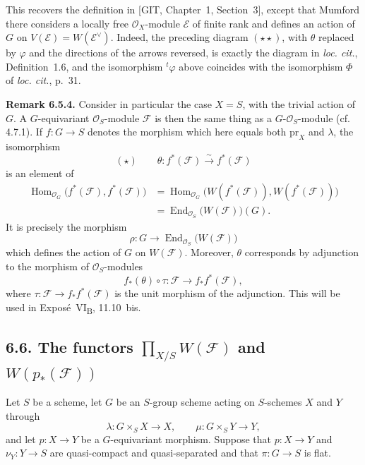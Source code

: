 This recovers the definition in [GIT, Chapter~1, Section~3], except that
Mumford there considers a locally free \(\mathcal O_X\)-module
\(\mathcal E\) of finite rank and defines an action of \(G\) on
\(V(\mathcal E)=W(\mathcal E^\vee)\). Indeed, the preceding diagram
\((\star\star)\), with \(\theta\) replaced by \(\varphi\) and the
directions of the arrows reversed, is exactly the diagram in
\emph{loc. cit.}, Definition~1.6, and the isomorphism
\({}^{t}\!\varphi\) above coincides with the isomorphism \(\Phi\) of
\emph{loc. cit.}, p.~31.

\medskip
\noindent\textbf{Remark 6.5.4.}
Consider in particular the case \(X=S\), with the trivial action of
\(G\). A \(G\)-equivariant \(\mathcal O_S\)-module \(\mathcal F\) is
then the same thing as a \(G\)-\(\mathcal O_S\)-module (cf. 4.7.1).
If \(f:G\to S\) denotes the morphism which here equals both
\(\mathrm{pr}_X\) and \(\lambda\), the isomorphism
\[
  (\star)\qquad
  \theta:f^*(\mathcal F)\xrightarrow{\ \sim\ }f^*(\mathcal F)
\]
is an element of
\[
\begin{aligned}
  \operatorname{Hom}_{\mathcal O_G}
    \bigl(f^*(\mathcal F),f^*(\mathcal F)\bigr)
  &=
  \operatorname{Hom}_{\mathcal O_G}
    \bigl(W(f^*(\mathcal F)),W(f^*(\mathcal F))\bigr)\\
  &=
  \operatorname{End}_{\mathcal O_S}\bigl(W(\mathcal F)\bigr)(G).
\end{aligned}
\]
It is precisely the morphism
\[
  \rho:G\longrightarrow
  \operatorname{End}_{\mathcal O_S}\bigl(W(\mathcal F)\bigr)
\]
which defines the action of \(G\) on \(W(\mathcal F)\). Moreover,
\(\theta\) corresponds by adjunction to the morphism of
\(\mathcal O_S\)-modules
\[
  f_*(\theta)\circ\tau:
  \mathcal F\longrightarrow f_*f^*(\mathcal F),
\]
where \(\tau:\mathcal F\to f_*f^*(\mathcal F)\) is the unit morphism
of the adjunction. This will be used in Expos\'e~VI\textsubscript{B},
11.10~bis.

\subsection*{6.6. The functors
\(\prod_{X/S}W(\mathcal F)\) and \(W(p_*(\mathcal F))\)}

Let \(S\) be a scheme, let \(G\) be an \(S\)-group scheme acting on
\(S\)-schemes \(X\) and \(Y\) through
\[
  \lambda:G\times_SX\to X,
  \qquad
  \mu:G\times_SY\to Y,
\]
and let \(p:X\to Y\) be a \(G\)-equivariant morphism. Suppose that
\(p:X\to Y\) and \(\nu_Y:Y\to S\) are quasi-compact and
quasi-separated and that \(\pi:G\to S\) is flat.

